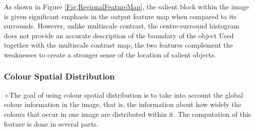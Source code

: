 \documentclass[10pt,twocolumn,letterpaper]{article}
\begin{document}
As shown in Figure \ref{Fig:RegionalFeatureMap}, the salient block within the image is given significant emphasis in the output feature map when compared to its surrounds.  However, unlike multiscale contrast, the centre-surround histogram does not provide an accurate description of the boundary of the object Used together with the multiscale contrast map, the two features complement the weaknesses to create a stronger sense of the location of salient objects.


\subsubsection{Colour Spatial Distribution}

+The goal of using colour spatial distribution is to take into account the global colour information in the image, that is, the information about how widely the colours that occur in one image are distributed within it.  The computation of this feature is done in several parts.
\end{document}
